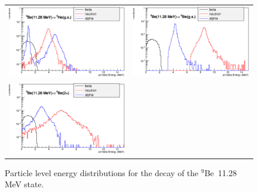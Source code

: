 \documentclass{JINST}
\newcommand{\beNINE}{$^{9}$Be~}
\begin{document}
    \begin{figure}[htp]
     \centering
     
  \begin{tabular}{cc}
    \includegraphics[width=70mm]{a_n_beta_spect_c11.eps} &

      \includegraphics[width=70mm]{a_n_beta_spect_c12.eps} \\

    \includegraphics[width=70mm]{a_n_beta_spect_c13.eps} &
   
   
    
    
      \end{tabular}
     \caption{Particle level energy distributions for the decay of the \beNINE 11.28 MeV state.}
    \end{figure}
\end{document}
